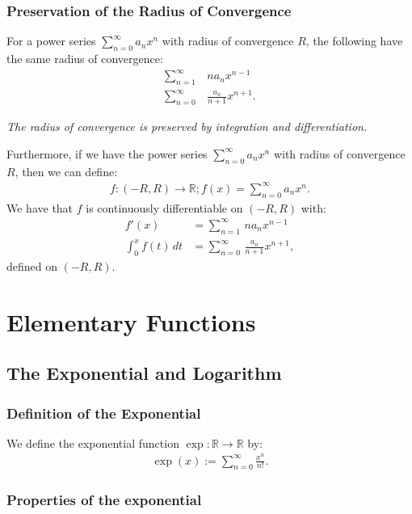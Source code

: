 \documentclass[a4paper, 12pt, twoside]{article}
\begin{document}
\subsubsection{Preservation of the Radius of Convergence}

For a power series $\sum_{n = 0}^\infty a_nx^n$ with radius of convergence $R$,
the following have the same radius of convergence:
\begin{align*}
      \sum_{n = 1}^\infty & \, na_nx^{n-1} \\
      \sum_{n = 0}^\infty & \, \frac{a_n}{n + 1}x^{n + 1}.
\end{align*}

\textit{The radius of convergence is preserved by integration and
differentiation.}

Furthermore, if we have the power series $\sum_{n = 0}^\infty a_nx^n$ with
radius of convergence $R$, then we can define:
\begin{align*}
      f : (-R, R) \to \mathbb{R}; f(x) = \sum_{n = 0}^\infty a_nx^n.
\end{align*}
We have that $f$ is continuously differentiable on $(-R, R)$ with:
\begin{align*}
      f'(x) &= \sum_{n = 1}^\infty \, na_nx^{n-1} \\
      \int_0^x f(t) \, dt &= \sum_{n = 0}^\infty \, \frac{a_n}{n + 1}x^{n + 1},
\end{align*}
defined on $(-R, R)$.

\section{Elementary Functions}

\subsection{The Exponential and Logarithm}

\subsubsection{Definition of the Exponential}

We define the exponential function $\exp : \mathbb{R} \to \mathbb{R}$ by:
\begin{align*}
      \exp(x) := \sum_{n = 0}^\infty \frac{x^n}{n!}.
\end{align*}

\subsubsection{Properties of the exponential}
\end{document}
